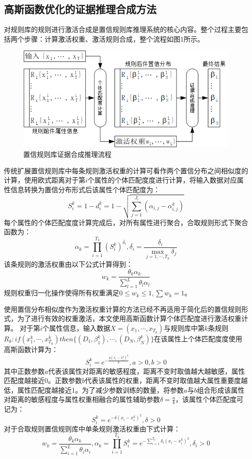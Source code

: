 \documentclass{cjc}
\begin{document}
\subsection{高斯函数优化的证据推理合成方法}
对规则库的规则进行激活合成是置信规则库推理系统的核心内容。整个过程主要包括两个步骤：计算激活权重、激活规则合成，整个流程如图1所示。
\begin{figure}
    \includegraphics[width=\linewidth]{1brb.png}
    \caption{置信规则库证据合成推理流程}
\end{figure}

传统扩展置信规则库中每条规则激活权重的计算可看作两个置信分布之间相似度的计算，使用欧式距离对于第$i$个属性的个体匹配度度进行计算，将输入数据对应属性信息转换为置信分布形式后该属性个体匹配度为：
$$S_i^k=1-d_i^k=1-\sqrt{\sum_{j=1}^{J_i}(\alpha_{i,j}-\alpha_{i,j}^k)}$$
每个属性的个体匹配度度计算完成后，对所有属性进行聚合，合取规则形式下聚合函数为：
$$\alpha_k=\prod_{i=1}^{T_k}(S_i^k)^{\overline{\delta_i}},\overline{\delta_i}=\frac{\delta_i}{\max_{j=1,\cdots,T_k}\delta_j}$$
该条规则的激活权重由以下公式计算得到：
$$w_k=\frac{\theta_k\alpha_k}{\sum_{l=1}^L\theta_l\alpha_l}$$
规则权重归一化操作使得所有权重满足$0\leq w_k\leq 1,\sum w_k=1$。

使用置信分布相似度作为激活权重计算的方法已经不再适用于简化后的置信规则形式，为了进行有效的权重激活，本文使用高斯函数计算个体匹配度进行激活权重计算。
对于第$i$个属性信息，输入数据$X=(x_1,\cdots,x_{T_k})$与规则库中第$k$条规则$R_k:if(x_1^k , \cdots , x_{T_k}^k)then\{(D_1,\beta_1^k),\cdots,(D_N,\beta_N^k)\}$在该属性上个体匹配度度使用高斯函数计算为：
$$S_i^k=e^{-\frac{a(x_i-x_i^k)^2}{b}},a>0,b>0$$
其中正数参数$a$代表该属性对距离的敏感程度，距离不变时取值越大越敏感，属性匹配度越接近0。正数参数$b$代表该属性的权重，距离不变时取值越大属性重要度越低，属性匹配度越接近1。为了减少参数训练的数量，将参数$a$与$b$组合形成该属性对距离的敏感程度与属性权重相融合的属性辅助参数$\delta=\frac{a}{b}$，该属性个体匹配度可记为：
$$S_i^k=e^{-\delta(x_i-x_i^k)^2},\delta>0$$
对于合取规则置信规则库中单条规则激活权重由下式计算：
$$w_k=\frac{\theta_k\alpha_k}{\sum_{i=1}^L\theta_i\alpha_i},\alpha_k=\prod_{i=1}^{T_k}S_i^k=e^{-\sum_{i=1}^{T_k}\delta_i(x_i-x_i^k)^2},\delta_i>0$$
\end{document}
